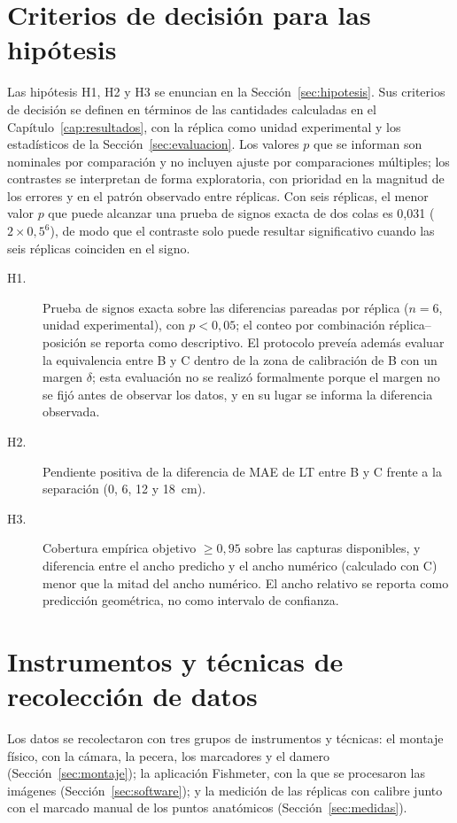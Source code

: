 \section{Criterios de decisión para las hipótesis}
\label{sec:criterios-hipotesis}

Las hipótesis H1, H2 y H3 se enuncian en la Sección~\ref{sec:hipotesis}. Sus criterios de decisión se definen en términos de las cantidades calculadas en el Capítulo~\ref{cap:resultados}, con la réplica como unidad experimental y los estadísticos de la Sección~\ref{sec:evaluacion}. Los valores $p$ que se informan son nominales por comparación y no incluyen ajuste por comparaciones múltiples; los contrastes se interpretan de forma exploratoria, con prioridad en la magnitud de los errores y en el patrón observado entre réplicas. Con seis réplicas, el menor valor $p$ que puede alcanzar una prueba de signos exacta de dos colas es 0,031 ($2 \times 0{,}5^{6}$), de modo que el contraste solo puede resultar significativo cuando las seis réplicas coinciden en el signo.

\begin{description}
  \item[H1.] Prueba de signos exacta sobre las diferencias pareadas por réplica ($n = 6$, unidad experimental), con $p < 0{,}05$; el conteo por combinación réplica--posición se reporta como descriptivo. El protocolo preveía además evaluar la equivalencia entre B y C dentro de la zona de calibración de B con un margen $\delta$; esta evaluación no se realizó formalmente porque el margen no se fijó antes de observar los datos, y en su lugar se informa la diferencia observada.
  \item[H2.] Pendiente positiva de la diferencia de MAE de LT entre B y C frente a la separación (0, 6, 12 y 18~cm).
  \item[H3.] Cobertura empírica objetivo $\geq 0{,}95$ sobre las capturas disponibles, y diferencia entre el ancho predicho y el ancho numérico (calculado con C) menor que la mitad del ancho numérico. El ancho relativo se reporta como predicción geométrica, no como intervalo de confianza.
\end{description}

\section{Instrumentos y técnicas de recolección de datos}
\label{sec:instrumentos}

Los datos se recolectaron con tres grupos de instrumentos y técnicas: el montaje físico, con la cámara, la pecera, los marcadores y el damero (Sección~\ref{sec:montaje}); la aplicación Fishmeter, con la que se procesaron las imágenes (Sección~\ref{sec:software}); y la medición de las réplicas con calibre junto con el marcado manual de los puntos anatómicos (Sección~\ref{sec:medidas}).

